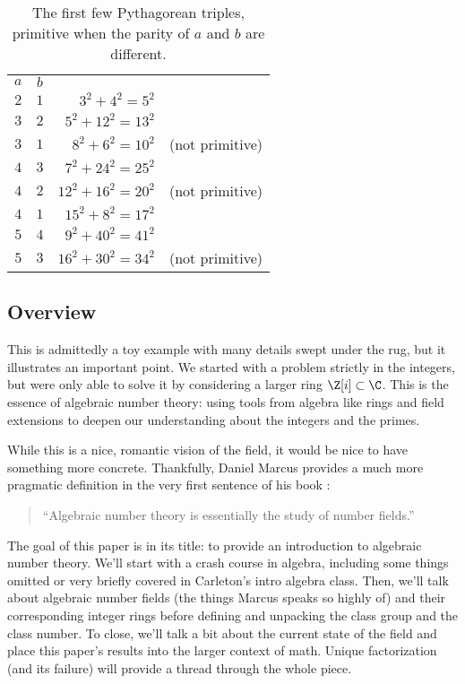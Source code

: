 \begin{table}
    \centering
    \footnotesize
    \begin{tabular}{c | c | r c}
        $a$ & $b$ &                                        \\
        \cline{1-3}
        $2$ & $1$ & $3^2 + 4^2 = 5^2$                      \\
        $3$ & $2$ & $5^2 + 12^2 = 13^2$                    \\
        $3$ & $1$ & $8^2 + 6^2 = 10^2$   & (not primitive) \\
        $4$ & $3$ & $7^2 + 24^2 = 25^2$                    \\
        $4$ & $2$ & $12^2 + 16^2 = 20^2$ & (not primitive) \\
        $4$ & $1$ & $15^2 + 8^2 = 17^2$                    \\
        $5$ & $4$ & $9^2 + 40^2 = 41^2$                    \\
        $5$ & $3$ & $16^2 + 30^2 = 34^2$ & (not primitive)
    \end{tabular}
    \caption{The first few Pythagorean triples, primitive when the parity of $a$ and $b$ are different.}
    \label{tab:pythagorean-triples}
\end{table}

\subsection{Overview}

This is admittedly a toy example with many details swept under the rug, but it illustrates an important point. We started with a problem strictly in the integers, but were only able to solve it by considering a larger ring $\Z[i] \subset \C$. This is the essence of algebraic number theory: using tools from algebra like rings and field extensions to deepen our understanding about the integers and the primes.

While this is a nice, romantic vision of the field, it would be nice to have something more concrete. Thankfully, Daniel Marcus provides a much more pragmatic definition in the very first sentence of his book \cite[1]{marcus}:
\begin{quote}
    ``Algebraic number theory is essentially the study of number fields.''
\end{quote}

The goal of this paper is in its title: to provide an introduction to algebraic number theory. We'll start with a crash course in algebra, including some things omitted or very briefly covered in Carleton's intro algebra class. Then, we'll talk about algebraic number fields (the things Marcus speaks so highly of) and their corresponding integer rings before defining and unpacking the class group and the class number. To close, we'll talk a bit about the current state of the field and place this paper's results into the larger context of math. Unique factorization (and its failure) will provide a thread through the whole piece.

